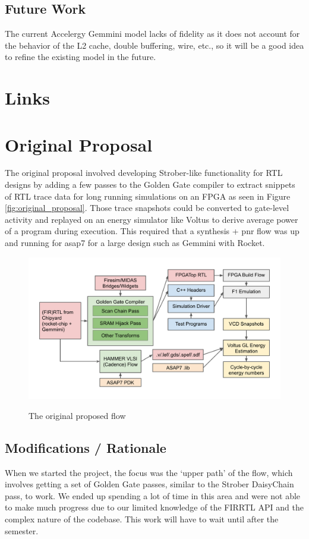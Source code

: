\documentclass[sigconf]{acmart}
\begin{document}
\subsection{Future Work}
The current Accelergy Gemmini model lacks of fidelity as it does not account for the behavior of the L2 cache, double buffering, wire, etc., so it will be a good idea to refine the existing model in the future.

\appendix
\section{Links}

\section{Original Proposal}
The original proposal involved developing Strober\cite{strober}-like functionality for RTL designs by adding a few passes to the Golden Gate compiler to extract snippets of RTL trace data for long running simulations on an FPGA as seen in Figure \ref{fig:original_proposal}.
Those trace snapshots could be converted to gate-level activity and replayed on an energy simulator like Voltus to derive average power of a program during execution.
This required that a synthesis + pnr flow was up and running for asap7 for a large design such as Gemmini with Rocket.

\begin{figure}
  \centering
  \includegraphics[width=\linewidth]{original_proposal.pdf}
  \label{fig:orignal_proposal}
  \caption{The original proposed flow}
\end{figure}

\subsection{Modifications / Rationale}
When we started the project, the focus was the `upper path' of the flow, which involves getting a set of Golden Gate passes, similar to the Strober DaisyChain pass, to work.
We ended up spending a lot of time in this area and were not able to make much progress due to our limited knowledge of the FIRRTL API and the complex nature of the codebase.
This work will have to wait until after the semester.
\end{document}
